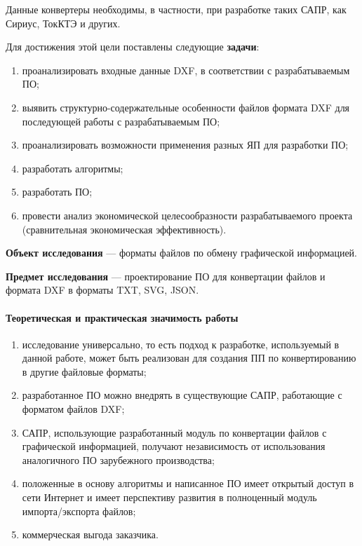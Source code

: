 Данные конвертеры необходимы, в частности, при разработке таких САПР, как Сириус, ТокКТЭ и других.

Для достижения этой цели поставлены следующие \textbf{задачи}:

\begin{enumerate}[1)]
	\item проанализировать входные данные DXF, в соответствии с разрабатываемым ПО;
	\item выявить структурно-содержательные особенности файлов формата DXF для последующей работы с разрабатываемым ПО;
	\item проанализировать возможности применения разных ЯП для разработки ПО;
	\item разработать алгоритмы;
	\item разработать ПО;
	\item провести анализ экономической целесообразности разрабатываемого проекта (сравнительная экономическая эффективность).
\end{enumerate}

\textbf{Объект исследования} --- форматы файлов по обмену графической информацией.

\textbf{Предмет исследования} --- проектирование ПО для конвертации файлов и формата DXF в форматы TXT, SVG, JSON.

\paragraph{Теоретическая и практическая значимость работы}

\begin{enumerate}
	\item исследование универсально, то есть подход к разработке, используемый в данной работе, может быть реализован для создания ПП по конвертированию в другие файловые форматы;
	\item разработанное ПО можно внедрять в существующие САПР, работающие с форматом файлов DXF;
	\item САПР, использующие разработанный модуль по конвертации файлов с графической информацией, получают независимость от использования аналогичного ПО зарубежного производства;
	\item положенные в основу алгоритмы и написанное ПО имеет открытый доступ в сети Интернет и имеет перспективу развития в полноценный модуль импорта/экспорта файлов;
	\item коммерческая выгода заказчика.
\end{enumerate}
